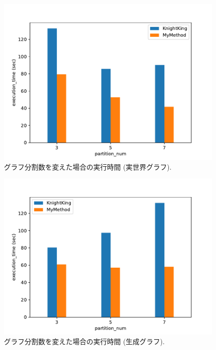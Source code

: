 \begin{figure}[t]
    \centering
    \includegraphics[scale=0.8]{figure/Kn_vs_AR_partition_num_LiveJournal.pdf}
    \caption{グラフ分割数を変えた場合の実行時間 (実世界グラフ).}
    \label{グラフ分割数を変えた場合の実行時間 (実世界グラフ)}
\end{figure}

\begin{figure}[t!]
    \centering
    \includegraphics[scale=0.8]{figure/Kn_vs_AR_partition_num_SBM_3.pdf}
    \caption{グラフ分割数を変えた場合の実行時間 (生成グラフ).}
    \label{グラフ分割数を変えた場合の実行時間 (生成グラフ)}
\end{figure}

